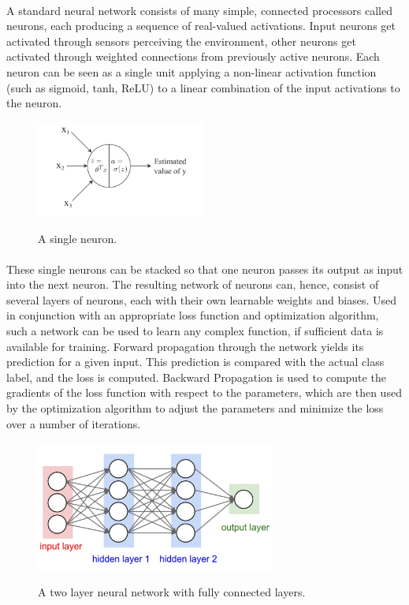 \documentclass[12pt, a4paper]{report}
\begin{document}
\paragraph{}
A standard neural network consists of many simple, connected processors called neurons, each producing a sequence of real-valued activations. Input neurons get activated through sensors perceiving the environment, other neurons get activated through weighted connections from previously active neurons. \cite{schmidhuber2015deep} Each neuron can be seen as a single unit applying a non-linear activation function (such as sigmoid, tanh, ReLU) to a linear combination of the input activations to the neuron.\cite{cs229}
\begin{figure}[h]
\centering
\includegraphics[width=0.5\textwidth]{nn1.png}
\caption{A single neuron.}\cite{cs229}
\end{figure}
\paragraph{}
These single neurons can be stacked so that one neuron passes its output as input into the next neuron. The resulting network of neurons can, hence, consist of several layers of neurons, each with their own learnable weights and biases. Used in conjunction with an appropriate loss function and optimization algorithm, such a network can be used to learn any complex function, if sufficient data is available for training. Forward propagation through the network yields its prediction for a given input. This prediction is compared with the actual class label, and the loss is computed. Backward Propagation is used to compute the gradients of the loss function with respect to the parameters, which are then used by the optimization algorithm to adjust the parameters and minimize the loss over a number of iterations.
\begin{figure}[h]
\centering
\includegraphics[width=0.7\textwidth]{nn2.png}
\caption{A two layer neural network with fully connected layers.}\cite{cs231n}
\end{figure}
\newpage
\end{document}
